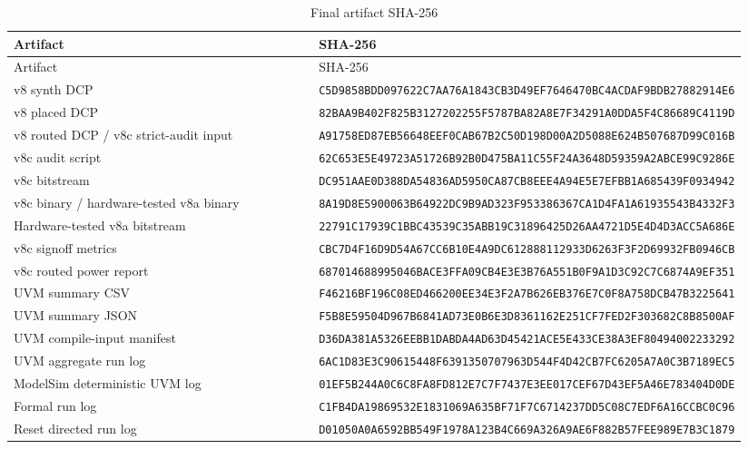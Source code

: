 \documentclass[UTF8,fontset=none,11pt,a4paper]{ctexrep}
\newcommand{\hashpair}[2]{\scriptsize\texttt{#1}\newline\texttt{#2}}
\begin{document}
\begin{longtable}{p{0.43\linewidth}p{0.51\linewidth}}
\caption{Final artifact SHA-256}\label{tab:artifact-hashes}\\
\toprule
Artifact & SHA-256 \\
\midrule
\endfirsthead
\toprule
Artifact & SHA-256 \\
\midrule
\endhead
v8 synth DCP & \hashpair{C5D9858BDD097622C7AA76A1843CB3D4}{9EF7646470BC4ACDAF9BDB27882914E6} \\
v8 placed DCP & \hashpair{82BAA9B402F825B3127202255F5787BA}{82A8E7F34291A0DDA5F4C86689C4119D} \\
v8 routed DCP / v8c strict-audit input & \hashpair{A91758ED87EB56648EEF0CAB67B2C50D}{198D00A2D5088E624B507687D99C016B} \\
v8c audit script & \hashpair{62C653E5E49723A51726B92B0D475BA1}{1C55F24A3648D59359A2ABCE99C9286E} \\
v8c bitstream & \hashpair{DC951AAE0D388DA54836AD5950CA87CB}{8EEE4A94E5E7EFBB1A685439F0934942} \\
v8c binary / hardware-tested v8a binary & \hashpair{8A19D8E5900063B64922DC9B9AD323F9}{53386367CA1D4FA1A61935543B4332F3} \\
Hardware-tested v8a bitstream & \hashpair{22791C17939C1BBC43539C35ABB19C31}{896425D26AA4721D5E4D4D3ACC5A686E} \\
v8c signoff metrics & \hashpair{CBC7D4F16D9D54A67CC6B10E4A9DC612}{888112933D6263F3F2D69932FB0946CB} \\
v8c routed power report & \hashpair{687014688995046BACE3FFA09CB4E3E3}{B76A551B0F9A1D3C92C7C6874A9EF351} \\
UVM summary CSV & \hashpair{F46216BF196C08ED466200EE34E3F2A7}{B626EB376E7C0F8A758DCB47B3225641} \\
UVM summary JSON & \hashpair{F5B8E59504D967B6841AD73E0B6E3D8}{361162E251CF7FED2F303682C8B8500AF} \\
UVM compile-input manifest & \hashpair{D36DA381A5326EEBB1DABDA4AD63D45}{421ACE5E433CE38A3EF80494002233292} \\
UVM aggregate run log & \hashpair{6AC1D83E3C90615448F6391350707963}{D544F4D42CB7FC6205A7A0C3B7189EC5} \\
ModelSim deterministic UVM log & \hashpair{01EF5B244A0C6C8FA8FD812E7C7F743}{7E3EE017CEF67D43EF5A46E783404D0DE} \\
Formal run log & \hashpair{C1FB4DA19869532E1831069A635BF71F}{7C6714237DD5C08C7EDF6A16CCBC0C96} \\
Reset directed run log & \hashpair{D01050A0A6592BB549F1978A123B4C669}{A326A9AE6F882B57FEE989E7B3C1879} \\

\end{longtable}
\end{document}
